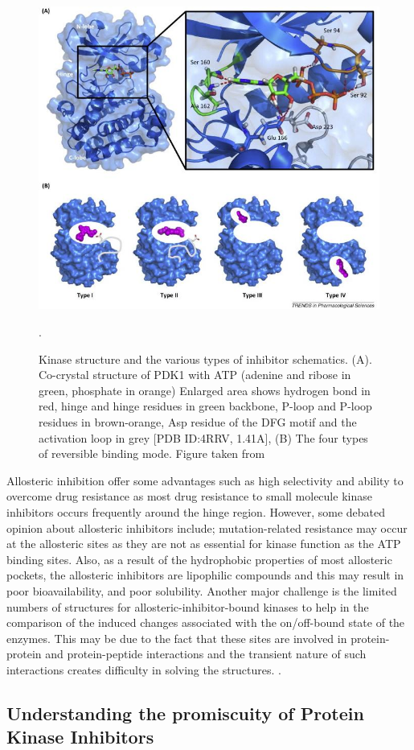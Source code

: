 \documentclass[a4paper, 11pt]{article}
\begin{document}
\begin{figure}[H]
	\includegraphics[width=.7\linewidth]{figures/kinase_inhibitors.jpg}
	\centering
	\caption{Kinase structure and the various types of inhibitor schematics. (A). Co-crystal structure of PDK1 with ATP (adenine and ribose in green, phosphate in orange) Enlarged area shows hydrogen bond in red, hinge and hinge residues in green backbone, P-loop and P-loop residues in brown-orange, Asp residue of the DFG motif  and the activation loop in grey [PDB ID:4RRV, 1.41A], (B) The four types of reversible binding  mode. Figure taken from \cite{wu2015fda}}.
	\label{type4inhibitor}
\end{figure}
Allosteric inhibition offer some advantages such as high  selectivity and ability to overcome drug resistance as most drug resistance to small molecule kinase inhibitors occurs frequently around the hinge region. However, some debated opinion about allosteric inhibitors include; mutation-related resistance may occur at the allosteric sites as they are not as essential for kinase function as the ATP binding sites. Also, as a result of the hydrophobic properties of most allosteric pockets, the allosteric inhibitors are lipophilic compounds and this may result in poor bioavailability, and poor solubility. Another major challenge is the limited numbers of structures for allosteric-inhibitor-bound kinases to help in the comparison of the induced changes associated with the on/off-bound state of the enzymes. This may be due to the fact that these sites are involved in protein-protein and protein-peptide interactions and the transient nature of such interactions creates difficulty in solving the structures. \cite{wu2015allosteric}.

\subsection*{Understanding the promiscuity of Protein Kinase Inhibitors}
\end{document}
